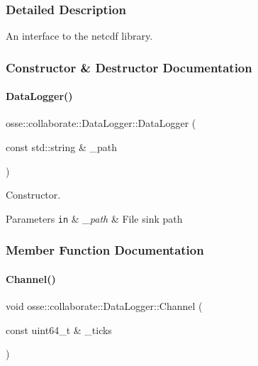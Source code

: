 \subsubsection{Detailed Description}
An interface to the netcdf library. 

\subsubsection{Constructor \& Destructor Documentation}
\mbox{\label{classosse_1_1collaborate_1_1_data_logger_a7f51038008c542dc5eb65575b30d9932}} 
\paragraph{\texorpdfstring{Data\+Logger()}{DataLogger()}}
{\footnotesize\ttfamily osse\+::collaborate\+::\+Data\+Logger\+::\+Data\+Logger (\begin{DoxyParamCaption}\item[{const std\+::string \&}]{\+\_\+path }\end{DoxyParamCaption})\hspace{0.3cm}{\ttfamily [explicit]}}



Constructor. 


\begin{DoxyParams}[1]{Parameters}
\mbox{\tt in}  & {\em \+\_\+path} & File sink path \\
\hline
\end{DoxyParams}


\subsubsection{Member Function Documentation}
\mbox{\label{classosse_1_1collaborate_1_1_data_logger_a8a0d8ce2e134ad2f16850d3412cd68e2}} 
\paragraph{\texorpdfstring{Channel()}{Channel()}}
{\footnotesize\ttfamily void osse\+::collaborate\+::\+Data\+Logger\+::\+Channel (\begin{DoxyParamCaption}\item[{const uint64\+\_\+t \&}]{\+\_\+ticks }\end{DoxyParamCaption})}



